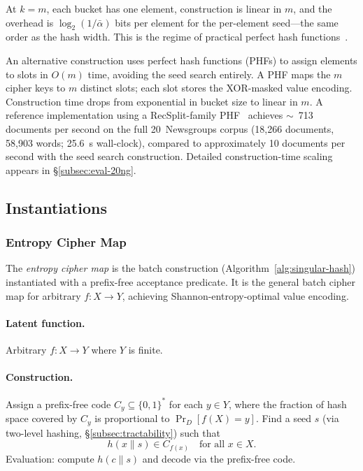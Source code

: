 \documentclass[11pt]{article}
\theoremstyle{definition}
\theoremstyle{plain}
\theoremstyle{remark}
\begin{document}
At $k = m$, each bucket has one element, construction is linear in $m$,
and the overhead is $\log_2(1/\bar{\alpha})$ bits per element for the
per-element seed---the same order as the hash width.  This is the regime
of practical perfect hash functions~\cite{belazzougui2009hash}.

An alternative construction uses perfect hash functions (PHFs) to assign
elements to slots in $O(m)$ time, avoiding the seed search entirely.  A PHF
maps the $m$ cipher keys to $m$ distinct slots; each slot stores the
XOR-masked value encoding.  Construction time drops from exponential in
bucket size to linear in $m$.  A reference implementation using a
RecSplit-family PHF~\cite{esposito2020recsplit} achieves $\sim$~713
documents per second on the full 20~Newsgroups corpus (18{,}266
documents, 58{,}903 words; 25.6~s wall-clock), compared to approximately
10 documents per second with the seed search construction.  Detailed
construction-time scaling appears in \S\ref{subsec:eval-20ng}.

\subsection{Instantiations}
\label{subsec:instantiations}

\subsubsection{Entropy Cipher Map}
\label{subsec:entropy-cipher-map}

The \emph{entropy cipher map} is the batch construction
(Algorithm~\ref{alg:singular-hash}) instantiated with a prefix-free
acceptance predicate.  It is the general batch cipher map for arbitrary
$f : X \to Y$, achieving Shannon-entropy-optimal value encoding.

\paragraph{Latent function.}
Arbitrary $f : X \to Y$ where $Y$ is finite.

\paragraph{Construction.}
Assign a prefix-free code $C_y \subseteq \{0,1\}^*$ for each $y \in Y$,
where the fraction of hash space covered by $C_y$ is proportional to
$\Pr_D[f(X) = y]$.  Find a seed $s$ (via two-level hashing,
\S\ref{subsec:tractability}) such that
\[
h(x \| s) \in C_{f(x)} \quad \text{for all } x \in X.
\]
Evaluation: compute $h(c \| s)$ and decode via the prefix-free code.
\end{document}
